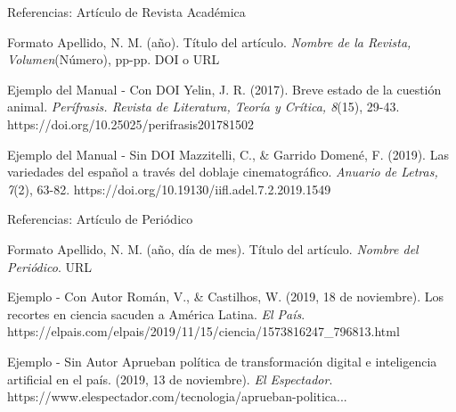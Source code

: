 \documentclass[spanish,aspectratio=169]{beamer}
\begin{document}
\begin{frame}{Referencias: Artículo de Revista Académica}
	\begin{block}{Formato}
		\small
		Apellido, N. M. (año). Título del artículo. \textit{Nombre de la Revista, Volumen}(Número), pp-pp. DOI o URL
	\end{block}
	
	\begin{exampleblock}{Ejemplo del Manual - Con DOI}
		\footnotesize
		Yelin, J. R. (2017). Breve estado de la cuestión animal. \textit{Perífrasis. Revista de Literatura, Teoría y Crítica, 8}(15), 29-43. https://doi.org/10.25025/perifrasis201781502
	\end{exampleblock}
	
	\begin{exampleblock}{Ejemplo del Manual - Sin DOI}
		\footnotesize
		Mazzitelli, C., \& Garrido Domené, F. (2019). Las variedades del español a través del doblaje cinematográfico. \textit{Anuario de Letras, 7}(2), 63-82. https://doi.org/10.19130/iifl.adel.7.2.2019.1549
	\end{exampleblock}
\end{frame}

\begin{frame}{Referencias: Artículo de Periódico}
	\begin{block}{Formato}
		\small
		Apellido, N. M. (año, día de mes). Título del artículo. \textit{Nombre del Periódico}. URL
	\end{block}
	
	\begin{exampleblock}{Ejemplo - Con Autor}
		\footnotesize
		Román, V., \& Castilhos, W. (2019, 18 de noviembre). Los recortes en ciencia sacuden a América Latina. \textit{El País}. https://elpais.com/elpais/2019/11/15/ciencia/1573816247\_796813.html
	\end{exampleblock}
	
	\begin{exampleblock}{Ejemplo - Sin Autor}
		\footnotesize
		Aprueban política de transformación digital e inteligencia artificial en el país. (2019, 13 de noviembre). \textit{El Espectador}. https://www.elespectador.com/tecnologia/aprueban-politica...
	\end{exampleblock}
\end{frame}
\end{document}
